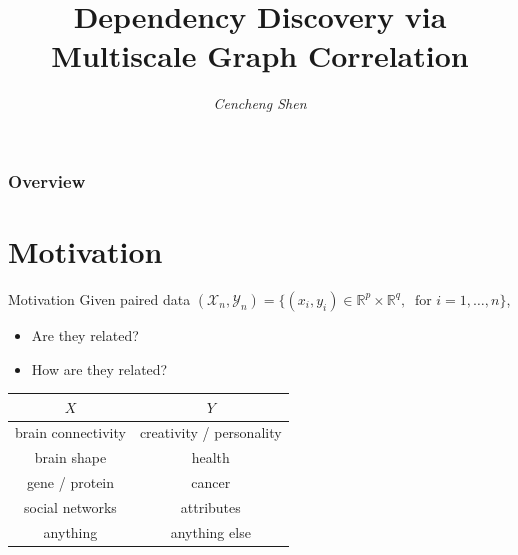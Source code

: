 \documentclass[mathserif,t]{beamer}
\title[MGC]{\fontfamily{qtm} \bfseries Dependency Discovery via\\
Multiscale Graph Correlation}
\author[C. Shen]{\large\textcolor{UniTitle}{\textit{Cencheng Shen}}} %
\institute[JHU]{\footnotesize\color{UniTitle}\textit{University of Delaware}\\ %
\bigskip
\bigskip
\bigskip
\bigskip
\textit{Collaborators: Carey E. Priebe, Joshua T. Vogelstein, Shangsi Wang, Ronak Mehta, Eric Bridgeford, Sambit Panda, Junhao Xiong, Youjin Lee, Qing Wang, Alex Badea, Xu Ting, Mauro Maggioni.\\
\medskip
Acknowledgment: NSF DMS, DARPA SIMPLEX.\\
\medskip
\medskip}}
\date{\footnotesize\color{UniTitle}\footnotesize\textit{}} %
\newcommand{\Real}{\mathbb{R}}
\newcommand{\Mgc}{MGC}
\begin{document}

\begin{frame}
\titlepage %
\end{frame}

\begin{frame}
\frametitle{Overview} %
\tableofcontents %
\end{frame}

\section{Motivation}
\begin{frame}{Motivation}
Given paired data $(\mathcal{X}_{n},\mathcal{Y}_{n})=\{(x_{i},y_{i}) \in \Real^{p} \times \Real^{q}, \ \mbox{ for } i=1,\ldots,n\}$,
\pause
\begin{itemize}[<+->]
\item Are they related?
\item How are they related?
\end{itemize}
\pause
\medskip

\begin{table}
\centering
\begin{tabular}{|c|c|}
\hline
\textbf{$X$} & \textbf{$Y$}   \\
\hline
brain connectivity  & creativity / personality \\
\hline 
brain shape & health \\
\hline
gene / protein & cancer\\
\hline
social networks & attributes \\
\hline
anything & anything else \\
\hline
\end{tabular}
\end{table}
\end{frame}
\end{document}
